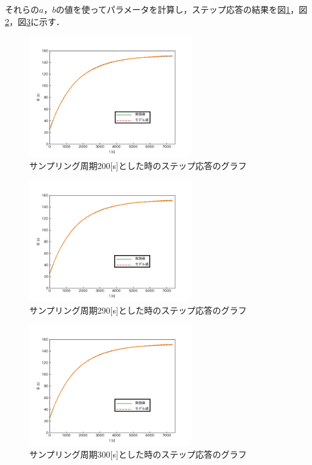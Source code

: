 \documentclass[12pt]{jsarticle}
\begin{document}
それらの$a$，$b$の値を使ってパラメータを計算し，ステップ応答の結果を図\ref{step_response200s}，図\ref{step_response290s}，図\ref{step_response300s}に示す．
\begin{figure}[tb]
  \begin{center}
    \includegraphics[clip,width=7.0cm]{../graph/step_response200s.png}
    \caption{サンプリング周期200[s]とした時のステップ応答のグラフ}
    \label{step_response200s}
  \end{center}
\end{figure}
\begin{figure}[tb]
  \begin{center}
    \includegraphics[clip,width=7.0cm]{../graph/step_response290s.png}
    \caption{サンプリング周期290[s]とした時のステップ応答のグラフ}
    \label{step_response290s}
  \end{center}
\end{figure}
\begin{figure}[tb]
  \begin{center}
    \includegraphics[clip,width=7.0cm]{../graph/step_response300s.png}
    \caption{サンプリング周期300[s]とした時のステップ応答のグラフ}
    \label{step_response300s}
  \end{center}
\end{figure}
\end{document}
